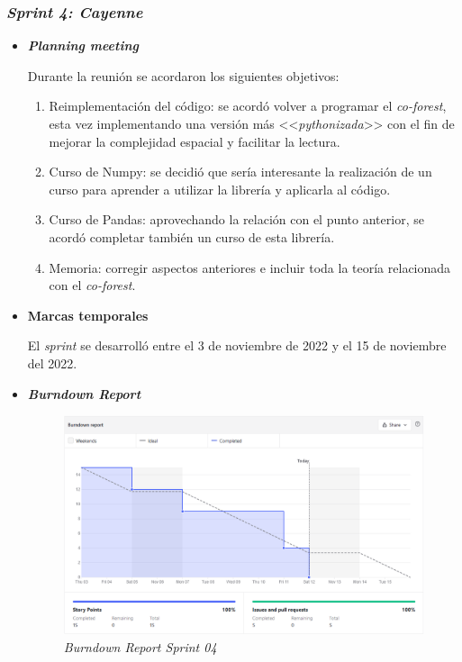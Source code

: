 \subsubsection{\textit{Sprint 4: Cayenne}}
\begin{itemize}
	\item \textbf{\textit{Planning meeting}}
	
	Durante la reunión se acordaron los siguientes objetivos:
	
	\begin{enumerate}
		\item Reimplementación del código: se acordó volver a programar el \textit{co-forest}, esta vez implementando una versión más <<\textit{pythonizada}>> con el fin de mejorar la complejidad espacial y facilitar la lectura.
		\item Curso de Numpy: se decidió que sería interesante la realización de un curso para aprender a utilizar la librería y aplicarla al código.
		\item Curso de Pandas: aprovechando la relación con el punto anterior, se acordó completar también un curso de esta librería.
		\item Memoria: corregir aspectos anteriores e incluir toda la teoría relacionada con el \textit{co-forest}.
	\end{enumerate}
	
	\item \textbf{Marcas temporales}
	
	El \textit{sprint} se desarrolló entre el 3 de noviembre de 2022 y el 15 de noviembre del 2022.
			
	\item \textbf{\textit{Burndown Report}}
	\begin{figure}[h]
		\caption{\textit{Burndown Report Sprint 04}}
		\centering
		\includegraphics[width=\textwidth]{../img/anexos/bdr/s04_bdr}
	\end{figure}
	

\end{itemize}
